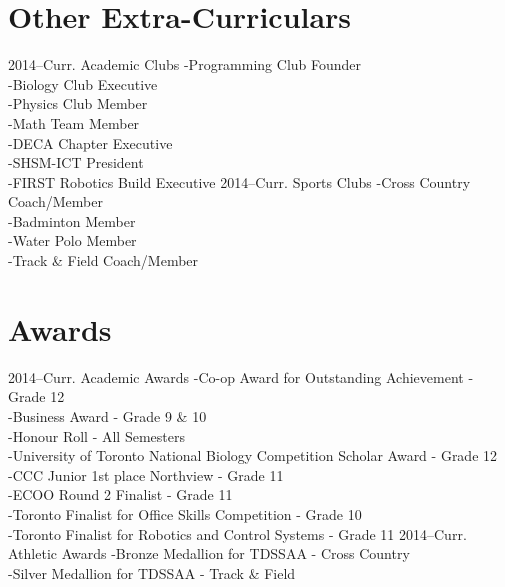 \documentclass[]{chandan-cv}
\begin{document}
\section{Other Extra-Curriculars}

\begin{entrylist}
  \entry
    {2014–Curr.}
    {Academic Clubs}
    {}
    { -Programming Club Founder
    \\-Biology Club Executive
    \\-Physics Club Member
    \\-Math Team Member
    \\-DECA Chapter Executive
    \\-SHSM-ICT President
    \\-FIRST Robotics Build Executive}
  \entry
    {2014–Curr.}
    {Sports Clubs}
    {}
    { -Cross Country Coach/Member
    \\-Badminton Member
    \\-Water Polo Member
    \\-Track \& Field Coach/Member}
\end{entrylist}

\section{Awards}

\begin{entrylist}
  \entry
    {2014–Curr.}
    {Academic Awards}
    {}
    { -Co-op Award for Outstanding Achievement - Grade 12
    \\-Business Award - Grade 9 \& 10
    \\-Honour Roll - All Semesters
    \\-University of Toronto National Biology Competition Scholar Award - Grade 12
    \\-CCC Junior 1st place Northview - Grade 11
    \\-ECOO Round 2 Finalist - Grade 11
    \\-Toronto Finalist for Office Skills Competition - Grade 10
    \\-Toronto Finalist for Robotics and Control Systems - Grade 11}
  \entry
    {2014–Curr.}
    {Athletic Awards}
    {}
    { -Bronze Medallion for TDSSAA - Cross Country
    \\-Silver Medallion for TDSSAA - Track \& Field}
\end{entrylist}
\end{document}
